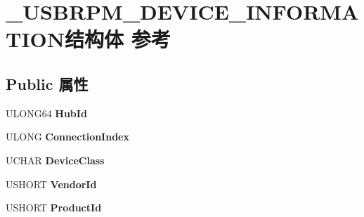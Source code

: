 \hypertarget{struct___u_s_b_r_p_m___d_e_v_i_c_e___i_n_f_o_r_m_a_t_i_o_n}{}\section{\+\_\+\+U\+S\+B\+R\+P\+M\+\_\+\+D\+E\+V\+I\+C\+E\+\_\+\+I\+N\+F\+O\+R\+M\+A\+T\+I\+O\+N结构体 参考}
\label{struct___u_s_b_r_p_m___d_e_v_i_c_e___i_n_f_o_r_m_a_t_i_o_n}
\subsection*{Public 属性}
\begin{DoxyCompactItemize}
\item 
\mbox{\label{struct___u_s_b_r_p_m___d_e_v_i_c_e___i_n_f_o_r_m_a_t_i_o_n_a5a6620e3d936790b59f7e36e2b89a644}} 
U\+L\+O\+N\+G64 {\bfseries Hub\+Id}
\item 
\mbox{\label{struct___u_s_b_r_p_m___d_e_v_i_c_e___i_n_f_o_r_m_a_t_i_o_n_a3d8f39b5303ee738da5ef7e4eb96e31d}} 
U\+L\+O\+NG {\bfseries Connection\+Index}
\item 
\mbox{\label{struct___u_s_b_r_p_m___d_e_v_i_c_e___i_n_f_o_r_m_a_t_i_o_n_a3244991a62468861185d4dd0d9803cb4}} 
U\+C\+H\+AR {\bfseries Device\+Class}
\item 
\mbox{\label{struct___u_s_b_r_p_m___d_e_v_i_c_e___i_n_f_o_r_m_a_t_i_o_n_a8c64e4702353709342e4f29baaa9f4d9}} 
U\+S\+H\+O\+RT {\bfseries Vendor\+Id}
\item 
\mbox{\label{struct___u_s_b_r_p_m___d_e_v_i_c_e___i_n_f_o_r_m_a_t_i_o_n_abe466d05f79edf1c3cf84b91ed0f3637}} 
U\+S\+H\+O\+RT {\bfseries Product\+Id}
\item 
\mbox{\label{struct___u_s_b_r_p_m___d_e_v_i_c_e___i_n_f_o_r_m_a_t_i_o_n_a70248cf4461708b40324646425a8ba10}} 

\end{DoxyCompactItemize}
